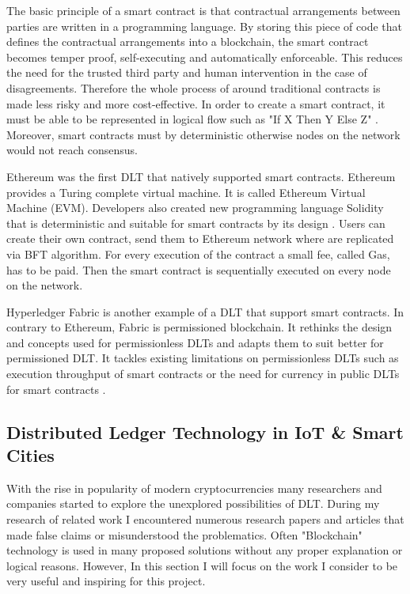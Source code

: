 The basic principle of a smart contract is that contractual arrangements between parties are written in a programming language. By storing this piece of code that defines the contractual arrangements into a blockchain, the smart contract becomes temper proof, self-executing and automatically enforceable. This reduces the need for the trusted third party and human intervention in the case of disagreements. Therefore the whole process of around traditional contracts is made less risky and more cost-effective. In order to create a smart contract, it must be able to be represented in logical flow such as "If X Then Y Else Z" \cite{mattila_blockchain_2016}. Moreover, smart contracts must by deterministic otherwise nodes on the network would not reach consensus.

Ethereum was the first DLT that natively supported smart contracts. Ethereum provides a Turing complete virtual machine. It is called Ethereum Virtual Machine (EVM). Developers also created new programming language Solidity that is deterministic and suitable for smart contracts by its design \cite{noauthor_introduction_nodate}. Users can create their own contract, send them to Ethereum network where are replicated via BFT algorithm. For every execution of the contract a small fee, called Gas, has to be paid. Then the smart contract is sequentially executed on every node on the network.

Hyperledger Fabric is another example of a DLT that support smart contracts. In contrary to Ethereum, Fabric is permissioned blockchain. It rethinks the design and concepts used for permissionless DLTs and adapts them to suit better for permissioned DLT. It tackles existing limitations on permissionless DLTs such as execution throughput of smart contracts or the need for currency in public DLTs for smart contracts \cite{vukolic_rethinking_2017}.

\subsection{Distributed Ledger Technology in IoT \& Smart Cities}
\quad With the rise in popularity of modern cryptocurrencies many researchers and companies started to explore the unexplored possibilities of DLT. During my research of related work I encountered numerous research papers and articles that made false claims or misunderstood the problematics. Often "Blockchain" technology is used in many proposed solutions without any proper explanation or logical reasons. However, In this section I will focus on the work I consider to be very useful and inspiring for this project.

